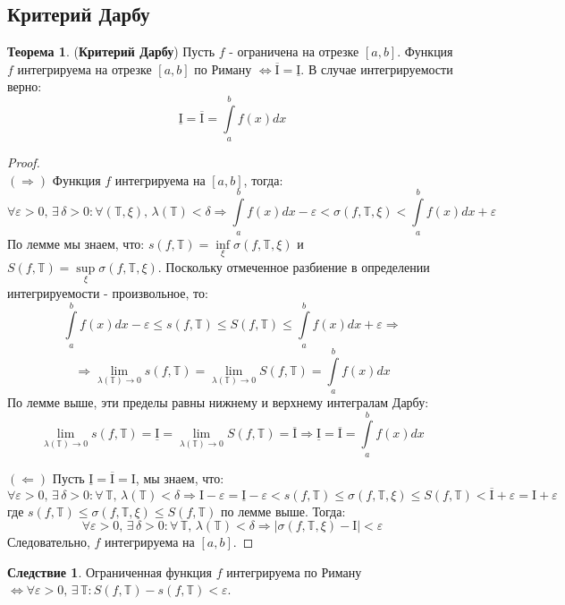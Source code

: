 \documentclass[12pt]{article}
\newcommand{\MTB}{\mathbb{T}}
\newcommand{\MI}{\mathrm{I}}
\newcommand{\VE}{\varepsilon}
\theoremstyle{definition}
\newtheorem{theorem}{Теорема}
\newtheorem{corollary}{Следствие}
\newcommand{\ddint}[2]{\displaystyle\int\limits_{#1}^{#2}}
\begin{document}
\subsection*{Критерий Дарбу}
\begin{theorem}(\textbf{Критерий Дарбу})
	Пусть $f$ - ограничена на отрезке $[a,b]$. Функция $f$ интегрируема на отрезке $[a,b]$ по Риману $\Leftrightarrow  \overline{\MI} = \underline{\MI}$. В случае интегрируемости верно:
	$$
		\underline{\MI} = \overline{\MI} = \int\limits_{a}^{b}f(x) dx	
	$$
\end{theorem}
\begin{proof}\hfill\\
	$(\Rightarrow)$ Функция $f$ интегрируема на $[a,b]$, тогда:
	$$
		\forall \VE > 0, \, \exists \, \delta > 0 \colon \forall (\MTB, \xi), \, \lambda(\MTB) < \delta \Rightarrow \ddint{a}{b}f(x) dx - \VE < \sigma(f,\MTB,\xi)  < \ddint{a}{b} f(x) dx + \VE
	$$
	По лемме мы знаем, что: $s(f,\MTB) = \inf\limits_{\xi}\sigma(f,\MTB, \xi)$ и $S(f,\MTB) = \sup\limits_{\xi}\sigma(f,\MTB,\xi)$. Поскольку отмеченное разбиение в определении интегрируемости - произвольное, то:
	$$
		\ddint{a}{b}f(x) dx - \VE \leq s(f,\MTB) \leq S(f,\MTB) \leq \ddint{a}{b} f(x) dx + \VE \Rightarrow
	$$
	$$
		\Rightarrow \lim\limits_{\lambda(\MTB) \to 0} s(f,\MTB) = \lim\limits_{\lambda(\MTB) \to 0} S(f,\MTB) = \ddint{a}{b}f(x) dx
	$$
	По лемме выше, эти пределы равны нижнему и верхнему интегралам Дарбу:
	$$
		\lim\limits_{\lambda(\MTB) \to 0} s(f,\MTB) = \underline{\MI} = \lim\limits_{\lambda(\MTB) \to 0} S(f,\MTB) = \overline{\MI}  \Rightarrow \underline{\MI} = \overline{\MI} = \ddint{a}{b}f(x) dx
	$$
	
	$(\Leftarrow)$ Пусть $\underline{\MI} = \overline{\MI} = \MI$, мы знаем, что:
	$$
		\forall \VE > 0, \, \exists \, \delta > 0 \colon \forall \, \MTB, \, \lambda(\MTB) < \delta \Rightarrow \MI -\VE = \underline{\MI} - \VE < s(f,\MTB) \leq \sigma(f,\MTB,\xi) \leq S(f,\MTB) < \overline{\MI} + \VE = \MI + \VE
	$$
	где $s(f,\MTB) \leq \sigma(f,\MTB,\xi) \leq S(f,\MTB)$ по лемме выше. Тогда:
	$$
		\forall \VE > 0, \, \exists \, \delta > 0 \colon \forall \, \MTB, \, \lambda(\MTB) < \delta \Rightarrow |\sigma(f,\MTB,\xi) - \MI| < \VE
	$$
	Следовательно, $f$ интегрируема на $[a,b]$.
\end{proof}
\begin{corollary}
	Ограниченная функция $f$ интегрируема по Риману $\Leftrightarrow \forall \VE > 0, \, \exists \, \MTB \colon S(f,\MTB) - s(f,\MTB) < \VE$. 
\end{corollary}
\end{document}
